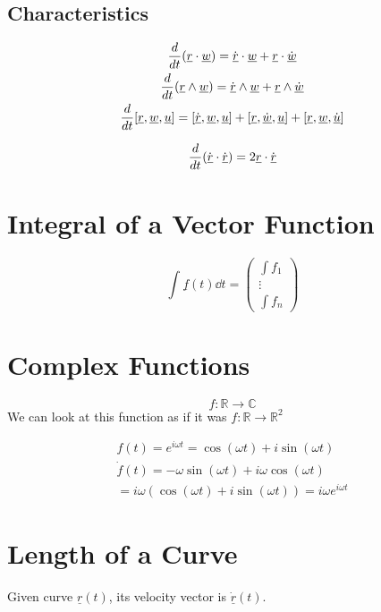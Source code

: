 \documentclass[00_complete]{subfiles}
\begin{document}
\subsection{Characteristics}
\begin{gather}
    \dv{t}(\underline r \cdot \underline w) = \dot{\underline r} \cdot
    \underline w + \underline r \cdot \dot{\underline w} \\
    \dv{t}(\underline r \land \underline w) = \dot{\underline r} \land
    \underline w + \underline r \land \dot{\underline w} \\
    \dv{t}[\underline r, \underline w, \underline u] = [\dot{\underline r},
    \underline w, \underline u] + [\underline r, \dot{\underline w}, \underline
    u] + [\underline r, \underline w, \dot{\underline u}]
\end{gather}
\begin{example}
    $$\dv{t}(\dot{\underline r}\cdot \dot{\underline r}) = 2\underline r \cdot
    \dot{\underline r}$$
\end{example}
\section{Integral of a Vector Function}
\begin{definition}
    $$\int \underline f(t)\dd{t} = \begin{pmatrix}
        \int f_1 \\ \vdots \\ \int f_n
    \end{pmatrix}$$
\end{definition}
\section{Complex Functions}
$$f: \mathbb{R} \to \mathbb{C}$$
We can look at this function as if it was $f: \mathbb{R} \to \mathbb{R}^2$
\begin{example}
\begin{gather*}
    f(t)=e^{i\omega t} = \cos(\omega t) + i\sin(\omega t) \\
    \dot f(t) = - \omega \sin(\omega t) + i \omega \cos(\omega t) \\
    =i\omega(\cos(\omega t) + i\sin(\omega t)) = i \omega e^{i \omega t}
\end{gather*}
\end{example}
\section{Length of a Curve}
Given curve $\underline r(t)$, its velocity vector is $\dot{\underline r}(t)$.
\end{document}
